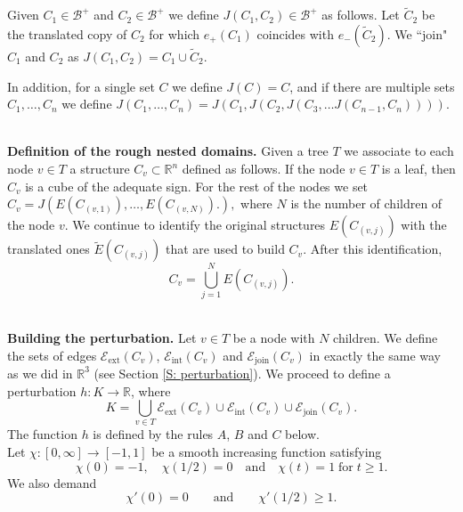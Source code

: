 \documentclass[11pt,reqno]{amsart}
\newcommand{\R}{{\mathbb R}}
\theoremstyle{definition}
\begin{document}
Given $C_1 \in \mathcal B^+$ and $C_2 \in \mathcal B^+$ we define $J(C_1, C_2) \in \mathcal B^+$  as follows. Let $\tilde C_2$ be the translated copy of $C_2$ for which $e_+(C_1)$ coincides with $e_-(\tilde C_2)$.
We ``join" $C_1$ and $C_2$  as
$J(C_1, C_2) = C_1 \cup \tilde C_2.$

In addition, for a single set $C$ we define $J(C)=C$, and if there are multiple sets $C_1, \dots, C_n$ we define $J(C_1, \dots, C_n)=J(C_1,  J(C_2, J(C_3, \dots J(C_{n-1},C_n)))).$


\ \\ {\bf Definition of the rough nested domains.} Given a tree $T$ we associate to each node  $v\in T$ a structure $C_{v} \subset \R^n$ defined as follows.  If the node   $v \in T$ is a leaf, then $C_{v}$ is a cube of the adequate sign. For the rest of the nodes we set
$ C_{ v}= J\left(E( C_{ (v,1)}), \dots, E( C_{ (v,N)}) \big.\right),$
where $N$ is the number of children of the node $v$.
We continue to identify the original structures $E( C_{ (v,j)})$ with the translated ones $\tilde E( C_{ (v,j)})$ that are used to build  $C_{v}$. After this identification, 
\[ C_{v}= \bigcup_{j=1}^N  E( C_{ (v,j)}).\]



\ \\ {\bf Building the perturbation.} 
Let  $v \in T$ be a node with $N$ children. We define the sets of edges $ \mathcal E_{\text{ext}}(C_v)$, $\mathcal E_{\text{int}}(C_v)$ and $\mathcal E_{\text{join}}(C_v)$ in exactly the same way as we did in $\R^3$ (see Section \ref{S: perturbation}).
  We  proceed to define a perturbation  $h:K \to \R$, where 
$$K=\bigcup_{v \in T} \mathcal E_{\text{ext}}(C_v)\cup \mathcal E_{\text{int}}(C_v)\cup   \mathcal E_{\text{join}}(C_v).$$ The function $h$ is defined by the rules $A$, $B$ and $C$ below. \\
Let $\chi:[0, \infty] \to [-1,1]$ be a smooth increasing function satisfying
\[\chi(0)=-1, \quad \chi(1/2)=0 \quad \text{and} \quad \chi(t) =1 \; \text{for}\; t \geq 1.\]
We also demand 
\begin{equation}\label{derivative}
\chi'(0)=0 \qquad \text{and}\qquad  \chi'(1/2) \geq 1.
\end{equation}\ \smallskip
\end{document}
